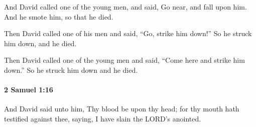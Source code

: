 			\begin{versebox}
					\item[BHS] 
					\item[ASV] And David called one of the young men, and said, Go near, and fall upon him. And he smote him, so that he died.
					\item[NIV] Then David called one of his men and said, “Go, strike him down!” So he struck him down, and he died.
					\item[NRSV] Then David called one of the young men and said, “Come here and strike him down.” So he struck him down and he died.
			\end{versebox}

		\paragraph{2 Samuel 1:16} %
			\label{2SAMUEL-1-16}

			And David said unto him, Thy blood be upon thy head; for thy mouth hath testified against thee, saying, I have slain the LORD’s anointed.

